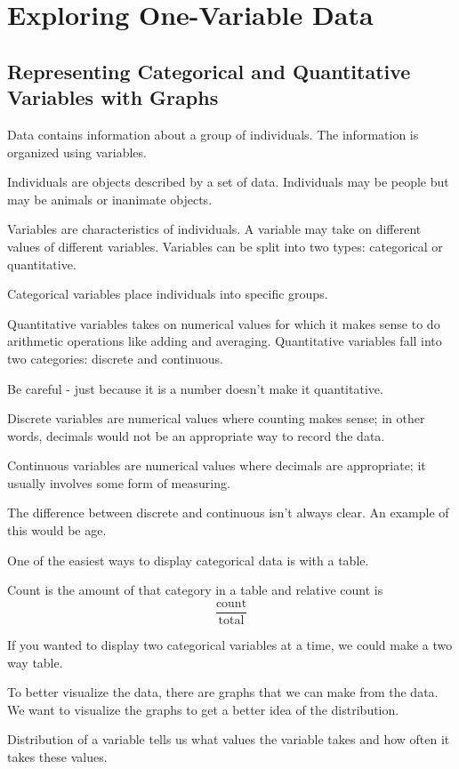 \documentclass[../stats.tex]{subfiles}
\begin{document}
\chapter{Exploring One-Variable Data}
\section{Representing Categorical and Quantitative Variables with Graphs}
Data contains information about a group of individuals. The information is organized using variables.

Individuals are objects described by a set of data. Individuals may be people but may be animals or inanimate objects.

Variables are characteristics of individuals. A variable may take on different values of different variables. 
Variables can be split into two types: categorical or quantitative.

Categorical variables place individuals into specific groups.

Quantitative variables takes on numerical values for which it makes sense to do arithmetic operations like adding and averaging. 
Quantitative variables fall into two categories: discrete and continuous.

Be careful - just because it is a number doesn't make it quantitative.

Discrete variables are numerical values where counting makes sense; in other words, decimals would not be an appropriate way to record the data.

Continuous variables are numerical values where decimals are appropriate; it usually involves some form of measuring.

The difference between discrete and continuous isn't always clear. An example of this would be age.

One of the easiest ways to display categorical data is with a table.

Count is the amount of that category in a table and relative count is 
\[\frac{\text{count}}{\text{total}}\]

If you wanted to display two categorical variables at a time, we could make a two way table.

To better visualize the data, there are graphs that we can make from the data. We want to visualize the graphs to get a better idea of the distribution.

Distribution of a variable tells us what values the variable takes and how often it takes these values.
\end{document}

